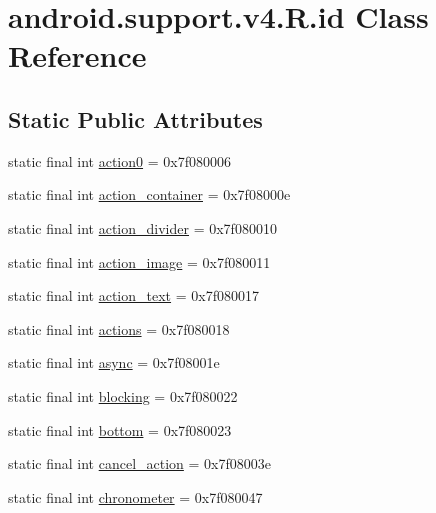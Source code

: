 \hypertarget{classandroid_1_1support_1_1v4_1_1_r_1_1id}{}\section{android.\+support.\+v4.\+R.\+id Class Reference}
\label{classandroid_1_1support_1_1v4_1_1_r_1_1id}
\subsection*{Static Public Attributes}
\begin{DoxyCompactItemize}
\item 
static final int \mbox{\hyperlink{classandroid_1_1support_1_1v4_1_1_r_1_1id_ad7592f41400f9252a235131ada4828fb}{action0}} = 0x7f080006
\item 
static final int \mbox{\hyperlink{classandroid_1_1support_1_1v4_1_1_r_1_1id_a1617e4a9372cb50c61bb626f78a0a55d}{action\+\_\+container}} = 0x7f08000e
\item 
static final int \mbox{\hyperlink{classandroid_1_1support_1_1v4_1_1_r_1_1id_a4041bc4105d0b0cf5cc0f800ccb65ab3}{action\+\_\+divider}} = 0x7f080010
\item 
static final int \mbox{\hyperlink{classandroid_1_1support_1_1v4_1_1_r_1_1id_a6b9142767e8558d1af9795db9ffd33c1}{action\+\_\+image}} = 0x7f080011
\item 
static final int \mbox{\hyperlink{classandroid_1_1support_1_1v4_1_1_r_1_1id_ab16eb01fb830a44ed3fa8f597f28b41b}{action\+\_\+text}} = 0x7f080017
\item 
static final int \mbox{\hyperlink{classandroid_1_1support_1_1v4_1_1_r_1_1id_ab48152021fc3f70bd7f40d59bd201328}{actions}} = 0x7f080018
\item 
static final int \mbox{\hyperlink{classandroid_1_1support_1_1v4_1_1_r_1_1id_affba5f51dd3beb3137a18fe8b868f042}{async}} = 0x7f08001e
\item 
static final int \mbox{\hyperlink{classandroid_1_1support_1_1v4_1_1_r_1_1id_ae7200c743d91bf8b61111e5ea58e4476}{blocking}} = 0x7f080022
\item 
static final int \mbox{\hyperlink{classandroid_1_1support_1_1v4_1_1_r_1_1id_aab918f3816949f77099f7717b436aae1}{bottom}} = 0x7f080023
\item 
static final int \mbox{\hyperlink{classandroid_1_1support_1_1v4_1_1_r_1_1id_a1791e09cc075d5474cf241c9df1a6ffd}{cancel\+\_\+action}} = 0x7f08003e
\item 
static final int \mbox{\hyperlink{classandroid_1_1support_1_1v4_1_1_r_1_1id_a9ba1c8e430ff76f2ee59bfccd415c103}{chronometer}} = 0x7f080047

\end{DoxyCompactItemize}
